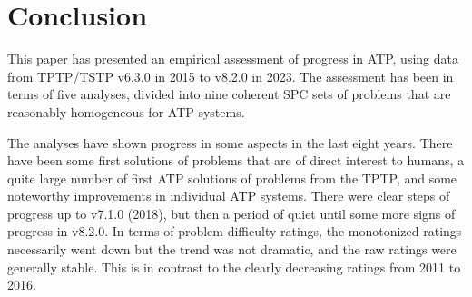 \documentclass[runningheads]{llncs}
\begin{document}
\section{Conclusion}
\label{Conclusion}

This paper has presented an empirical assessment of progress in ATP, using data from TPTP/TSTP
v6.3.0 in 2015 to v8.2.0 in 2023.
The assessment has been in terms of five analyses, divided into nine coherent SPC sets of problems
that are reasonably homogeneous for ATP systems.

The analyses have shown progress in some aspects in the last eight years.
There have been some first solutions of problems that are of direct interest to humans, 
a quite large number of first ATP solutions of problems from the TPTP, and 
some noteworthy improvements in individual ATP systems.
There were clear steps of progress up to v7.1.0 (2018), but then a period of quiet until some
more signs of progress in v8.2.0.
In terms of problem difficulty ratings, the monotonized ratings necessarily went down but the 
trend was not dramatic, and the raw ratings were generally stable.
This is in contrast to the clearly decreasing ratings from 2011 to 2016.
\end{document}

